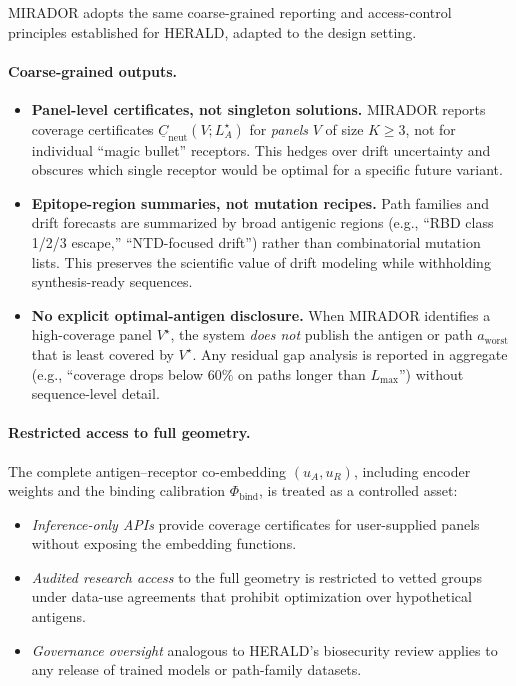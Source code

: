 \documentclass[11pt]{article}
\begin{document}
MIRADOR adopts the same coarse-grained reporting and access-control principles established for
HERALD, adapted to the design setting.

\paragraph{Coarse-grained outputs.}
\begin{itemize}
  \item \textbf{Panel-level certificates, not singleton solutions.}
  MIRADOR reports coverage certificates
  $\underline{C}_{\mathrm{neut}}(V;L_A^\star)$ for \emph{panels} $V$ of size $K \ge 3$, not for
  individual ``magic bullet'' receptors. This hedges over drift uncertainty and obscures which
  single receptor would be optimal for a specific future variant.

  \item \textbf{Epitope-region summaries, not mutation recipes.}
  Path families and drift forecasts are summarized by broad antigenic regions (e.g., ``RBD
  class 1/2/3 escape,'' ``NTD-focused drift'') rather than combinatorial mutation lists. This
  preserves the scientific value of drift modeling while withholding synthesis-ready sequences.

  \item \textbf{No explicit optimal-antigen disclosure.}
  When MIRADOR identifies a high-coverage panel $V^\star$, the system \emph{does not} publish
  the antigen or path $a_{\mathrm{worst}}$ that is least covered by $V^\star$. Any residual
  gap analysis is reported in aggregate (e.g., ``coverage drops below $60\%$ on paths longer
  than $L_{\max}$'') without sequence-level detail.
\end{itemize}

\paragraph{Restricted access to full geometry.}
The complete antigen--receptor co-embedding $(u_A, u_R)$, including encoder weights and the
binding calibration $\Phi_{\mathrm{bind}}$, is treated as a controlled asset:
\begin{itemize}
  \item \emph{Inference-only APIs} provide coverage certificates for user-supplied panels
        without exposing the embedding functions.
  \item \emph{Audited research access} to the full geometry is restricted to vetted groups
        under data-use agreements that prohibit optimization over hypothetical antigens.
  \item \emph{Governance oversight} analogous to HERALD's biosecurity review applies to any
        release of trained models or path-family datasets.
\end{itemize}
\end{document}

